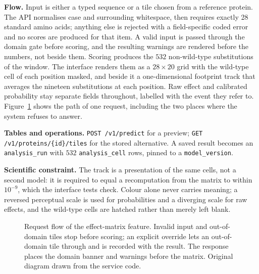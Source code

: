 \textbf{Flow.} Input is either a typed sequence or a tile chosen from a reference protein. The API
normalises case and surrounding whitespace, then requires exactly 28 standard amino acids; anything
else is rejected with a field-specific coded error and no scores are produced for that item. A valid
input is passed through the domain gate before scoring, and the resulting warnings are rendered
before the numbers, not beside them. Scoring produces the $532$ non-wild-type substitutions of the
window. The interface renders them as a $28\times20$ grid with the wild-type cell of each position
masked, and beside it a one-dimensional footprint track that averages the nineteen substitutions at
each position. Raw effect and calibrated probability stay separate fields throughout, labelled with
the event they refer to.
Figure~\ref{fig:app-predict-flow} shows the path of one request, including the two places where
the system refuses to answer.

\begin{table}[htbp]
  \centering
  \caption[Implemented physical data model]{Implemented physical data model, read from the service code. ``Casc.'' counts foreign keys
  that delete with their parent, ``Uq.'' unique constraints, ``Ck.'' check constraints and ``Idx.''
  explicit indexes; ``Mig.'' is the migration that creates the table. ``FK'' counts foreign-key
  constraints and ``Casc.'' how many of them delete with their parent.}
  \label{tab:app-pdm}
  
\end{table}

\textbf{Tables and operations.} \texttt{POST /v1/predict} for a preview;
\texttt{GET /v1/\allowbreak{}proteins/\allowbreak{}\{id\}/\allowbreak{}tiles} for the stored alternative. A saved result becomes an
\texttt{analysis\_run} with $532$ \texttt{analysis\_cell} rows, pinned to a \texttt{model\_version}.

\textbf{Scientific constraint.} The track is a presentation of the same cells, not a second model:
it is required to equal a recomputation from the matrix to within $10^{-9}$, which the interface
tests check. Colour alone never carries meaning; a reversed perceptual scale is used for
probabilities and a diverging scale for raw effects, and the wild-type cells are hatched rather than
merely left blank.

\begin{figure}[htbp]
  \centering
  
  \caption[Request flow of the effect-matrix feature]{Request flow of the effect-matrix feature. Invalid input and out-of-domain tiles stop
  before scoring; an explicit override lets an out-of-domain tile through and is recorded with the
  result. The response places the domain banner and warnings before the matrix. Original diagram
  drawn from the service code.}
  \label{fig:app-predict-flow}
\end{figure}


